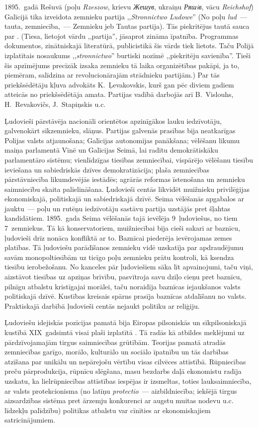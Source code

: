 \documentclass[twoside,a5paper,12pt,fleqn,openany]{extbook}
\newcommand{\pltxti}[1]{\textit{\textpolish{#1}}}
\newcommand{\rutxti}[1]{\textit{\textrussian{#1}}}
\newcommand{\detxti}[1]{\textit{\textgerman{#1}}}
\newcommand{\latxti}[1]{\textit{\textlatin{#1}}}
\newcommand{\uktxti}[1]{\textit{\textukrainian{#1}}}
\begin{document}
1895.~gadā Rešuvā (poļu \pltxti{Rzeszow}, krievu \rutxti{Жешув}, ukraiņu \uktxti{Ряшiв}, vācu \detxti{Reichshof}) Galīcijā tika izveidota zemnieku partija ,,\pltxti{Stronnictwo Ludowe}'' (No poļu \pltxti{lud}~--- tauta, zemniecība,~--- Zemnieku jeb Tautas partija). Tās piekritējus tautā sauca par . (Tiesa, lietojot vārdu ,,partija'', jāsaprot zināma īpatnība. Programmas dokumentos, zinātniskajā literatūrā, publicistikā šis vārds tiek lietots. Taču Polijā izplatītais nosaukums ,,\pltxti{stronnictwo}'' burtiski nozīmē ,,piekritēju savienība''. Tieši šis apzīmējums precīzāk izsaka zemnieku tā laika organizētības pakāpi, ja to, piemēram, salīdzina ar revolucionārajām strādnieku partijām.) Par tās priekšsēdētāju kļuva advokāts K.~Ļevakovskis, kurš gan pēc diviem gadiem atteicās no priekšsēdētāja amata. Partijas vadībā darbojās arī B.~Vislouhs, H.~Revakovičs, J.~Stapiņskis u.c.

Ļudovieši pārstāvēja nacionāli orientētos apzinīgākos lauku iedzīvotāju, galvenokārt sīkzemnieku, slāņus. Partijas galvenās prasības bija neatkarīgas Polijas valsts atjaunošana; Galīcijas autonomijas panākšana; vēlēšanu likumu maiņa parlamentā Vīnē un Galīcijas Seimā, lai radītu demokrātiskāku parlamentāro sistēmu; vienlīdzīgas tiesības zemniecībai, vispārējo vēlēšanu tiesību ieviešana un sabiedriskās dzīves demokratizācija; plaša zemniecības pārstāvniecība likumdevējās iestādēs; agrārās reformas īstenošana un zemnieku saimniecību skaita palielināšana. Ļudovieši centās likvidēt muižnieku privilēģijas ekonomiskajā, politiskajā un sabiedriskajā dzīvē. Seima vēlēšanās apgabalos ar jauktu~--- poļu un rutēņu iedzīvotāju sastāvu partija uzstājās pret šļahtas kandidātiem. 1895.~gada Seima vēlēšanās tajā ievēlēja 9~ļudoviešus, no tiem 7~zemniekus. Tā kā konservatoriem, muižniecībai bija cieši sakari ar baznīcu, ļudovieši drīz nonāca konfliktā ar to. Baznīcai piederēja ievērojamas zemes platības. Tā ļudoviešu parādīšanos zemnieku vidē uzskatīja par apdraudējumu savām monopoltiesībām uz ticīgo poļu zemnieku prātu kontroli, kā ksendza tiesību ierobežošanu. No kanceles pār ļudoviešiem sāka līt apvainojumi, taču viņi, aizstāvot tiesības uz apziņas brīvību, pasvītroja savu dziļo cieņu pret baznīcu, pilnīgu atbalstu kristīgajai morālei, taču noraidīja baznīcas iejaukšanos valsts politiskajā dzīvē. Kustības kreisais spārns prasīja baznīcas atdalīšanu no valsts. Praktiskajā darbībā ļudovieši centās nejaukt politiku ar reliģiju.

Ļudoviešu idejiskās pozīcijas pamatā bija Eiropas pilsoniskās un sīkpilsoniskajā kustībā XIX~gadsimtā visai plaši izplatītā . Tā radās kā atbildes meklējumi uz pārdzīvojamajām tirgus saimniecības grūtībām. Teorijas pamatā atradās zemniecības garīgo, morālo, kulturālo un sociālo īpatnību un tās darbības atzīšana par unikālu un nepārejošu vērtību visas cilvēces attīstībā. Rūpniecības preču pārprodukcija, rūpnīcu slēgšana, masu bezdarbs daļā ekonomistu radīja uzskatu, ka lielrūpniecības attīstības iespējas ir izsmeltas, toties lauksaimniecība, ar valsts protekcionisma (no latīņu \latxti{protectio}~--- aizbildniecība; iekšējā tirgus aizsardzības sistēma pret ārzemju konkurenci ar augstu muitas nodevu u.c. līdzekļu palīdzību) politikas atbalstu var cīnīties ar ekonomiskajiem satricinājumiem.
\end{document}
